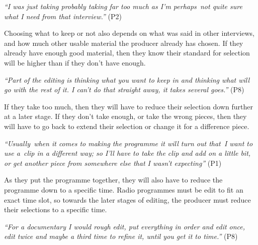 \textit{``I was just taking probably taking far too much as I'm perhaps not quite sure what I need from that
interview.''} (P2)



Choosing what to keep or not also depends on what was said in other interviews, and how much other usable material the
producer already has chosen. If they already have enough good material, then they know their standard for selection
will be higher than if they don't have enough.

\textit{``Part of the editing is thinking what you want to keep in and thinking what will go with the rest of it. I
can't do that straight away, it takes several goes.''} (P8)

If they take too much, then they will have to reduce their selection down further at a later stage. If they don't take
enough, or take the wrong pieces, then they will have to go back to extend their selection or change it for a
difference piece.

\textit{``Usually when it comes to making the programme it will turn out that I want to use a clip in a different way;
so I'll have to take the clip and add on a little bit, or get another piece from somewhere else that I wasn't
expecting''} (P1)

As they put the programme together, they will also have to reduce the programme down to a specific time. Radio
programmes must be edit to fit an exact time slot, so towards the later stages of editing, the producer must reduce
their selections to a specific time.

\textit{``For a documentary I would rough edit, put everything in order and edit once, edit twice and maybe a third
time to refine it, until you get it to time.''} (P8)

